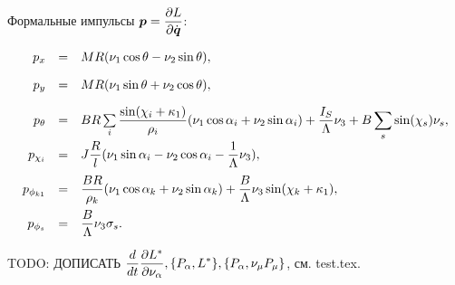 Формальные импульсы $\vec{p} = \ddpd{L}{\dot{\vec{q}}}$:

\begin{equation}\label{p}
    \begin{array}{rcl}
        p_x & = & MR(\nu_1\cos\theta-\nu_2\sin\theta),\vsp
        p_y & = & MR(\nu_1\sin\theta+\nu_2\cos\theta),\vsp
        p_\theta & = & BR\sum\limits_i\ddfrac{\sin(\chi_i + \kappa_1)}{\rho_i}(\nu_1\cos\alpha_i + \nu_2\sin\alpha_i) + \ddfrac{I_S}{\Lambda}\nu_3 + B\sum\limits_s\sin(\chi_s)\nu_s,\vsp
        p_{\chi_i} & = & J\ddfrac{R}{l}(\nu_1\sin\alpha_i - \nu_2\cos\alpha_i - \ddfrac{1}{\Lambda}\nu_3),\vsp
        p_{\phi_{k1}} & = & \ddfrac{BR}{\rho_k}(\nu_1\cos\alpha_k + \nu_2\sin\alpha_k) + \ddfrac{B}{\Lambda}\nu_3\sin(\chi_k+\kappa_1),\vsp
        p_{\phi_s} & = & \ddfrac{B}{\Lambda}\nu_3\sigma_s.
    \end{array}
\end{equation}

TODO: ДОПИСАТЬ $\displaystyle\frac{\displaystyle d}{\displaystyle dt}\frac{\partial L^{*}}{\partial \nu_\alpha}, \{P_\alpha, L^{*}\}, \{P_\alpha, \nu_\mu P_\mu\}$, см. test.tex.